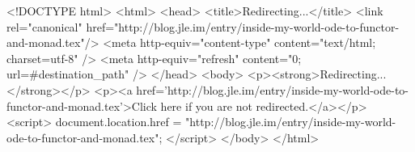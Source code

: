 <!DOCTYPE html>
<html>
<head>
<title>Redirecting...</title>
<link rel="canonical" href="http://blog.jle.im/entry/inside-my-world-ode-to-functor-and-monad.tex"/>
<meta http-equiv="content-type" content="text/html; charset=utf-8" />
<meta http-equiv="refresh" content="0; url=#{destination_path}" />
</head>
<body>
  <p><strong>Redirecting...</strong></p>
  <p><a href='http://blog.jle.im/entry/inside-my-world-ode-to-functor-and-monad.tex'>Click here if you are not redirected.</a></p>
  <script>
    document.location.href = "http://blog.jle.im/entry/inside-my-world-ode-to-functor-and-monad.tex";
  </script>
</body>
</html>
